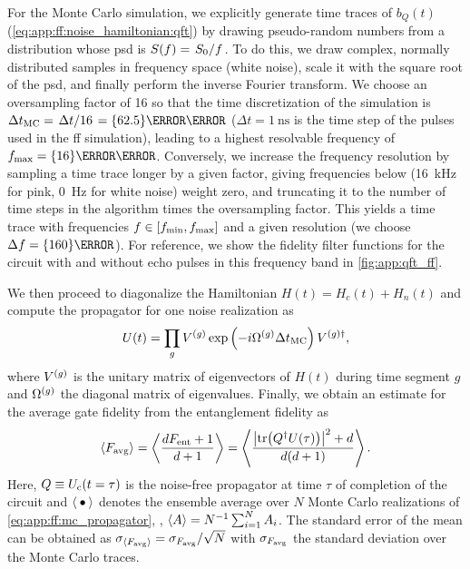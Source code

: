 For the Monte Carlo simulation, we explicitly generate time traces of $b_Q(t)$ (\cf \cref{eq:app:ff:noise_hamiltonian:qft}) by drawing pseudo-random numbers from a distribution whose \gls{psd} is $S(f) = \flatfrac{S_0}{f}$.
To do this, we draw complex, normally distributed samples in frequency space (\ie white noise), scale it with the square root of the \gls{psd}, and finally perform the inverse Fourier transform.
We choose an oversampling factor of 16 so that the time discretization of the simulation is $\Delta t_\mr{MC} = \flatfrac{\Delta t}{16} = \qty{62.5}{\pico\second}$ ($\Delta t = \qty{1}{\nano\second}$ is the time step of the pulses used in the \gls{ff} simulation), leading to a highest resolvable frequency of $\fmax = \qty{16}{\giga\hertz}$.
Conversely, we increase the frequency resolution by sampling a time trace longer by a given factor, giving frequencies below \fmin (\qty{16}{\kilo\hertz} for pink, \qty{0}{\hertz} for white noise) weight zero, and truncating it to the number of time steps in the algorithm times the oversampling factor.
This yields a time trace with frequencies $f\in [f_{\mathrm{min}}, f_{\mathrm{max}}]$ and a given resolution (we choose $\df = \qty{160}{\hertz}$).
For reference, we show the fidelity filter functions for the circuit with and without echo pulses in this frequency band in \cref{fig:app:qft_ff}.

We then proceed to diagonalize the Hamiltonian $H(t) = H_c(t) + H_n(t)$ and compute the propagator for one noise realization as
\begin{equation}\label{eq:app:ff:mc_propagator}
    U(t) = \prod_g V^{(g)}\exp\left(-i\Omega^{(g)}\Delta t_{\mathrm{MC}}\right) V^{(g)\dagger},
\end{equation}
where $V^{(g)}$ is the unitary matrix of eigenvectors of $H(t)$ during time segment $g$ and $\Omega^{(g)}$ the diagonal matrix of eigenvalues.
Finally, we obtain an estimate for the average gate fidelity \avgfid from the entanglement fidelity \entfid as
\begin{equation}
    \ev{\avgfid} = \ev{\frac{d\entfid + 1}{d+1}} = \ev{\frac{\abs{\tr(Q\adjoint U(\tau))}^2 + d}{d(d+1)}}.
\end{equation}
Here, $Q\equiv U_{\mathrm{c}}(t=\tau)$ is the noise-free propagator at time $\tau$ of completion of the circuit and $\ev{\placeholder}$ denotes the ensemble average over $N$ Monte Carlo realizations of \cref{eq:app:ff:mc_propagator}, \ie, $\ev{A}=N\inverse\sum_{i=1}^N A_i$.
The standard error of the mean can be obtained as $\sigma_{\ev{\avgfid}} = \sigma_{\avgfid} / \sqrt{N}$ with $\sigma_{F_{\mathrm{avg}}}$ the standard deviation over the Monte Carlo traces.

